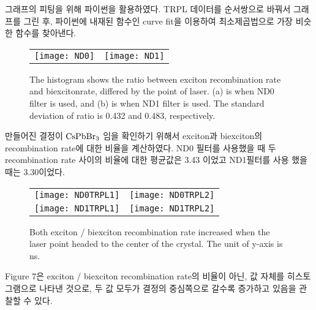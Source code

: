 그래프의 피팅을 위해 파이썬을 활용하였다. TRPL 데이터를 순서쌍으로 바꿔서 그래프를 그린 후, 파이썬에 내재된 함수인 curve fit을 이용하여 최소제곱법으로 가장 비슷한 함수를 찾아낸다.
\begin{figure}[t]
	\begin{center}
		\begin{tabular}{cc}
			\texttt{[image: ND0]} &
			\texttt{[image: ND1]}
		\end{tabular}
		\caption{The histogram shows the ratio between exciton recombination rate and biexcitonrate, differed by the point of laser. (a) is when ND0 filter is used, and (b) is when ND1 filter is used. The standard deviation of ratio is 0.432 and 0.483, respectively. }	
		\label{fig:FIR221}
	\end{center}
\end{figure}
 만들어진 결정이 $\rm{CsPbBr_3}$ 임을 확인하기 위해서 exciton과 biexciton의 recombination rate에 대한 비율을 계산하였다. 
ND0 필터를 사용했을 때 두 recombination rate 사이의 비율에 대한 평균값은 3.43 이었고 ND1필터를 사용 했을 때는 3.30이었다.
\clearpage
\begin{figure}[h]
	\begin{center}
		\begin{tabular}{cc}
			\texttt{[image: ND0TRPL1]} &
			\texttt{[image: ND0TRPL2]}\\
			\texttt{[image: ND1TRPL1]} &
			\texttt{[image: ND1TRPL2]}
		\end{tabular}
		\caption{Both exciton / biexciton recombination rate increased when the laser point headed to the center of the crystal. The unit of y-axis is ns.}	
		\label{fig:FIR221}
	\end{center}
\end{figure}
Figure 7은 exciton / biexciton recombination rate의 비율이 아닌, 값 자체를 히스토그램으로 나타낸 것으로, 두 값 모두가 결정의 중심쪽으로 갈수록 증가하고 있음을 관찰할 수 있다. 